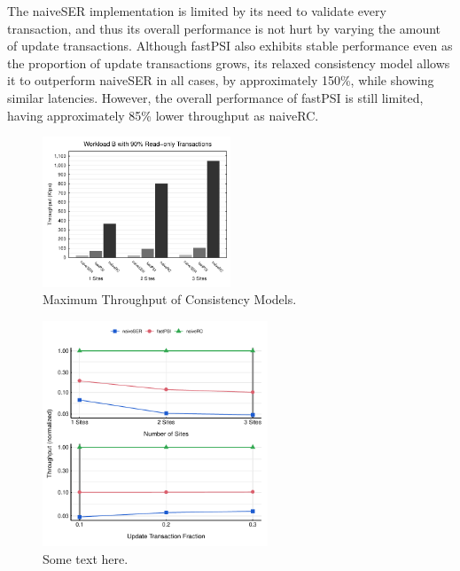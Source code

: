 The naiveSER implementation is limited by its need to validate every transaction, and thus its overall performance is not hurt by varying the amount of update transactions. Although fastPSI also exhibits stable performance even as the proportion of update transactions grows, its relaxed consistency model allows it to outperform naiveSER in all cases, by approximately 150\%, while showing similar latencies. However, the overall performance of fastPSI is still limited, having approximately 85\% lower throughput as naiveRC.


\begin{figure}[h]
\begin{center}
\includegraphics[width=0.5\textwidth]{figures/sites_bench.pdf}
\vspace{-1cm}
\end{center}
\caption{Maximum Throughput of Consistency Models.}
\label{fig:site_bench}
\end{figure}

\begin{figure}[htb!]
\begin{center}
\includegraphics[width=0.6\textwidth]{figures/dynamic_bench.pdf}
\vspace{-0.5cm}
\end{center}
\caption{Some text here.}
\label{fig:dynamic_bench}
\end{figure}

